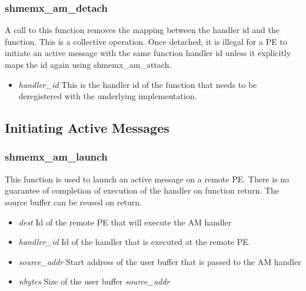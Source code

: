\subsubsection{shmemx\_am\_detach}
A call to this function removes the mapping 
between the handler id and the function. This is a 
collective operation. Once detached, it is illegal 
for a PE to initiate an active message with the 
same function handler id unless it explicitly maps 
the id again using shmemx\_am\_attach.\\


\begin{itemize}
    \item \textit{handler\_id} This is the handler 
        id of the function that needs to be 
        deregistered with the underlying 
        implementation.
\end{itemize}


\subsection{Initiating Active Messages}

\subsubsection{shmemx\_am\_launch}
This function is used to launch an active message
on a remote PE. There is no guarantee of 
completion of execution of the handler on function 
return. The source buffer can be reused on 
return.\\



 \begin{itemize}
     \item \textit{dest} Id of the remote PE that 
         will execute the AM handler
     \item \textit{handler\_id} Id of the handler 
         that is executed at the remote PE.
     \item \textit{source\_addr} Start address of 
         the user buffer that is passed to the 
         AM handler
     \item \textit{nbytes} Size of the user buffer 
         \textit{source\_addr}
 \end{itemize}

